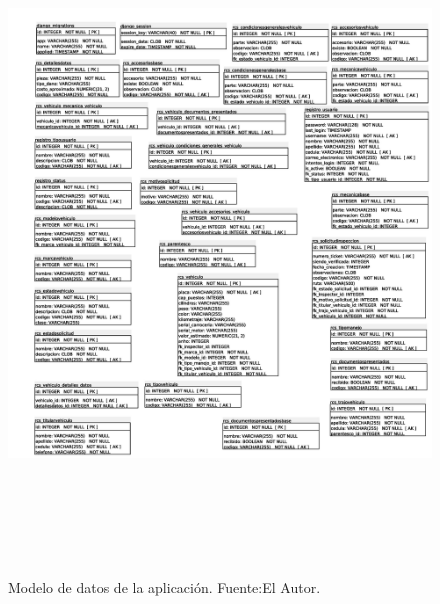 \begin{figure}[H]
\begin{center}
	\includegraphics[width=\textwidth, height=18cm]{img/modelado/modelo_f.jpg}
\end{center}
\caption{Modelo de datos de la aplicación. Fuente:El Autor.}
\label{fig:modelo_datos_de_la_aplicacion}
\end{figure}

\newpage


